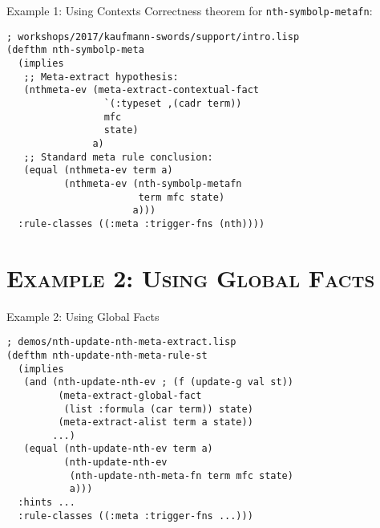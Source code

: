\begin{frame}[fragile]{Example 1: Using Contexts}
Correctness theorem for \texttt{nth-symbolp-metafn}:

\begin{verbatim}
; workshops/2017/kaufmann-swords/support/intro.lisp
(defthm nth-symbolp-meta
  (implies
   ;; Meta-extract hypothesis:
   (nthmeta-ev (meta-extract-contextual-fact
                 `(:typeset ,(cadr term))
                 mfc 
                 state)
               a)
   ;; Standard meta rule conclusion:
   (equal (nthmeta-ev term a)
          (nthmeta-ev (nth-symbolp-metafn
                       term mfc state)
                      a)))
  :rule-classes ((:meta :trigger-fns (nth))))
\end{verbatim}

\end{frame}
\section{\scshape Example 2: Using Global Facts}
\begin{frame}[fragile]{Example 2: Using Global Facts}

\begin{verbatim}
; demos/nth-update-nth-meta-extract.lisp
(defthm nth-update-nth-meta-rule-st
  (implies
   (and (nth-update-nth-ev ; (f (update-g val st))
         (meta-extract-global-fact
          (list :formula (car term)) state)
         (meta-extract-alist term a state))
        ...)
   (equal (nth-update-nth-ev term a)
          (nth-update-nth-ev
           (nth-update-nth-meta-fn term mfc state)
           a)))
  :hints ...
  :rule-classes ((:meta :trigger-fns ...)))
\end{verbatim}

\end{frame}
